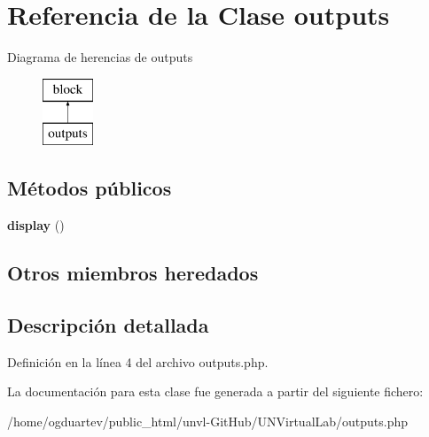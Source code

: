 \hypertarget{classoutputs}{}\section{Referencia de la Clase outputs}
\label{classoutputs}
Diagrama de herencias de outputs\begin{figure}[H]
\begin{center}
\leavevmode
\includegraphics[height=2.000000cm]{classoutputs}
\end{center}
\end{figure}
\subsection*{Métodos públicos}
\begin{DoxyCompactItemize}
\item 
\mbox{\label{classoutputs_ab48bb5d47938c85da5891c1250c18a5f}} 
{\bfseries display} ()
\end{DoxyCompactItemize}
\subsection*{Otros miembros heredados}


\subsection{Descripción detallada}


Definición en la línea 4 del archivo outputs.\+php.



La documentación para esta clase fue generada a partir del siguiente fichero\+:\begin{DoxyCompactItemize}
\item 
/home/ogduartev/public\+\_\+html/unvl-\/\+Git\+Hub/\+U\+N\+Virtual\+Lab/outputs.\+php\end{DoxyCompactItemize}
